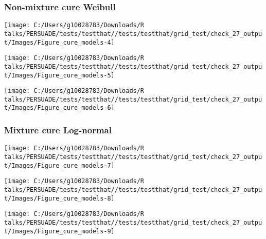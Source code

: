 \documentclass[
]{article}
\begin{document}
\clearpage

\subsubsection{Non-mixture cure Weibull}\label{non-mixture-cure-weibull}

\begin{flushleft}\texttt{[image: C:/Users/g10028783/Downloads/R talks/PERSUADE/tests/testthat//tests/testthat/grid\_test/check\_27\_output/Images/Figure\_cure\_models-4]} \end{flushleft}

\begin{flushleft}\texttt{[image: C:/Users/g10028783/Downloads/R talks/PERSUADE/tests/testthat//tests/testthat/grid\_test/check\_27\_output/Images/Figure\_cure\_models-5]} \end{flushleft}

\begin{flushleft}\texttt{[image: C:/Users/g10028783/Downloads/R talks/PERSUADE/tests/testthat//tests/testthat/grid\_test/check\_27\_output/Images/Figure\_cure\_models-6]} \end{flushleft}

\clearpage

\subsubsection{Mixture cure Log-normal}\label{mixture-cure-log-normal}

\begin{flushleft}\texttt{[image: C:/Users/g10028783/Downloads/R talks/PERSUADE/tests/testthat//tests/testthat/grid\_test/check\_27\_output/Images/Figure\_cure\_models-7]} \end{flushleft}

\begin{flushleft}\texttt{[image: C:/Users/g10028783/Downloads/R talks/PERSUADE/tests/testthat//tests/testthat/grid\_test/check\_27\_output/Images/Figure\_cure\_models-8]} \end{flushleft}

\begin{flushleft}\texttt{[image: C:/Users/g10028783/Downloads/R talks/PERSUADE/tests/testthat//tests/testthat/grid\_test/check\_27\_output/Images/Figure\_cure\_models-9]} \end{flushleft}
\end{document}
